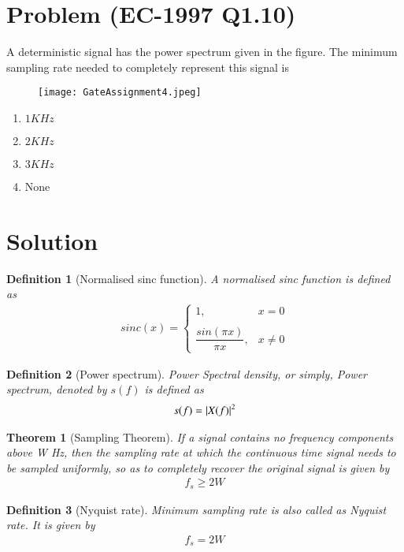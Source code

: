 \documentclass[journal,12pt,twocolumn]{IEEEtran}
\newtheorem{theorem}{Theorem}[section]
\newtheorem{definition}{Definition}[section]
\begin{document}
\section{Problem (EC-1997 Q1.10)}
A deterministic signal has the power spectrum given in the figure. The minimum sampling rate needed to completely represent this signal is
\begin{figure}[!h]
 \centering
 \texttt{[image: GateAssignment4.jpeg]}
 \label{plot}
\end{figure}
\begin{enumerate}
    \item $1 KHz$
    \item $2 KHz$
    \item $3 KHz$
    \item None
\end{enumerate}
\section{Solution}
\begin{definition}[Normalised sinc function]
A normalised sinc function is defined as
\begin{align}
    sinc(x)=\begin{cases}
	1, & x=0 \\~\\[-1em]
	\dfrac{sin(\pi x)}{\pi x}, & x\neq 0
	\end{cases}
	\label{eq:sinc}
\end{align}
\end{definition}
\begin{definition}[Power spectrum]
Power Spectral density, or simply, Power spectrum, denoted by $s(f)$ is defined as  \label{eq:def}
\begin{align}
    s(f)=\vert X(f)\vert^2
\end{align}
\end{definition}
\begin{theorem}[Sampling Theorem]
If a signal contains no frequency components above W Hz, then the sampling rate at which the continuous time signal needs to be sampled uniformly, so as to completely recover the original signal is given by
\begin{align}
    f_s\geq2W
    \label{eq:sthm}
\end{align}
\end{theorem}
\begin{definition}[Nyquist rate]
Minimum sampling rate is also called as Nyquist rate. It is given by
\begin{align}
    f_s=2W
    \label{eq:ns}
\end{align}
\end{definition}
\end{document}
